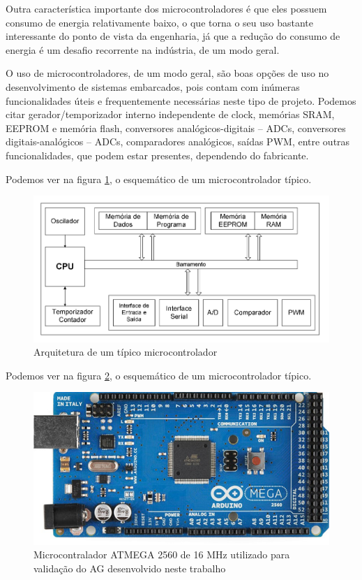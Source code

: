 \documentclass[
    12pt,               %
    oneside,%
    a4paper,            %
    english,            %
    french,             %
    spanish,            %
    brazil,             %
    ]{abntex2}
\begin{document}
  Outra característica importante dos microcontroladores é que eles possuem consumo de energia relativamente baixo, o que torna o seu uso bastante interessante do ponto de vista da engenharia, já que a redução do consumo de energia é um desafio recorrente na indústria, de um modo geral.

  O uso de microcontroladores, de um modo geral, são boas opções de uso no desenvolvimento de sistemas embarcados, pois contam com inúmeras funcionalidades úteis e frequentemente necessárias neste tipo de projeto. Podemos citar gerador/temporizador interno independente de clock, memórias SRAM, EEPROM e memória flash, conversores analógicos-digitais – ADCs, conversores digitais-analógicos – ADCs, comparadores analógicos, saídas PWM, entre outras funcionalidades, que podem estar presentes, dependendo do fabricante.

 Podemos ver na figura \ref{fig:esquematico_microcontrolador}, o esquemático de um microcontrolador típico.
 	
 	\begin{figure}[tb]
	\centering 
	\includegraphics[width=1.0\columnwidth]{images/esquematico_microcontrolador} 
	\caption[Arquitetura de um típico microcontrolador]{Arquitetura de um típico microcontrolador}
	\label{fig:esquematico_microcontrolador} 
	\end{figure}

  Podemos ver na figura \ref{fig:microcontrolador_atmega}, o esquemático de um microcontrolador típico.

  	\begin{figure}[tb]
	\centering 
	\includegraphics[width=0.5\columnwidth]{images/microcontrolador_atmega} 
	\caption[Microcontralador ATMEGA 2560]{Microcontralador ATMEGA 2560 de 16 MHz utilizado para validação do AG desenvolvido neste trabalho}
	\label{fig:microcontrolador_atmega} 
	\end{figure}
\end{document}
